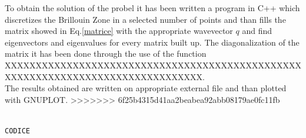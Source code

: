 \documentclass{article}
\begin{document}
To obtain the solution of the probel it has been written a program in C++ which discretizes the Brillouin Zone in a selected number of points and than fills the matrix showed in Eq.\ref{matrice} with the appropriate wavevector $q$ and find eigenvectors and eigenvalues for every matrix built up. The diagonalization of the matrix it has been done through the use of the function XXXXXXXXXXXXXXXXXXXXXXXXXXXXXXXXXXXXXXXXXXXXXXXXXXXXXXXXXXXXXXXXXXXXXXXXXXXXXXXX. \\
The results obtained are written on appropriate external file and than plotted with GNUPLOT.
>>>>>>> 6f25b4315d41aa2beabea92abb08179ae0fc11fb

\begin{lstlisting}[language=C++, caption={Subroutine norma \\ \emph{maodulo.f90}}]

CODICE

\end{lstlisting} 


	
\end{document}
